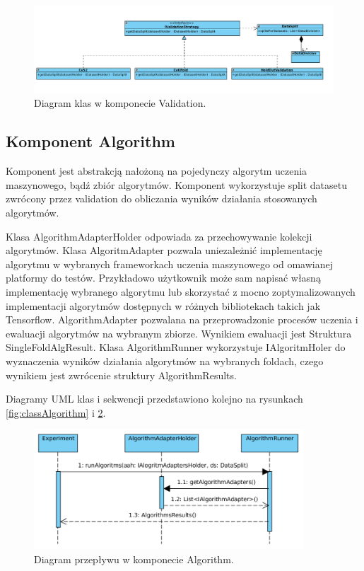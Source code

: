 \documentclass[12pt]{article}
\begin{document}
\begin{figure}[!h]
\centering
	\includegraphics[width=1.0\textwidth]{img/class_diagrams/validation.png}
	\caption{Diagram klas w komponecie Validation.}
	\label{fig:Validation}
\end{figure}
\newpage

\subsection{Komponent Algorithm}

Komponent jest abstrakcją nałożoną na pojedynczy algorytm uczenia maszynowego, bądź zbiór algorytmów. Komponent wykorzystuje split datasetu zwrócony przez validation do obliczania wyników działania stosowanych algorytmów. 
 
Klasa AlgorithmAdapterHolder odpowiada za przechowywanie kolekcji algorytmów. Klasa AlgoritmAdapter pozwala uniezależnić implementację algorytmu w wybranych frameworkach uczenia maszynowego od omawianej platformy do testów. Przykładowo użytkownik może sam napisać własną implementację wybranego algorytmu lub skorzystać z mocno zoptymalizowanych implementacji algorytmów dostępnych w różnych bibliotekach takich jak Tensorflow. AlgorithmAdapter pozwalana na przeprowadzonie procesów uczenia i ewaluacji algorytmów na wybranym zbiorze. Wynikiem ewaluacji jest Struktura SingleFoldAlgResult. Klasa AlgorithmRunner wykorzystuje IAlgoritmHoler do wyznaczenia wyników działania algorytmów na wybranych foldach, czego wynikiem jest zwrócenie struktury AlgorithmResults.

Diagramy UML klas i sekwencji przedstawiono kolejno na rysunkach \ref{fig:classAlgorithm} i \ref{fig:sequenceAlgorithm}.

\begin{figure}[!h]
	\centering
	\includegraphics[width=0.9\textwidth]{img/sequenceAlgorithm.png}
	\caption{Diagram przepływu w komponecie Algorithm.}
	\label{fig:sequenceAlgorithm}
\end{figure}
\end{document}
